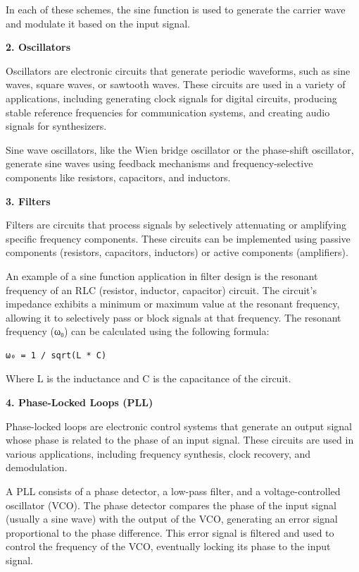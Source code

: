\documentclass[
]{article}
\begin{document}
In each of these schemes, the sine function is used to generate the
carrier wave and modulate it based on the input signal.

\textbf{2. Oscillators}

Oscillators are electronic circuits that generate periodic waveforms,
such as sine waves, square waves, or sawtooth waves. These circuits are
used in a variety of applications, including generating clock signals
for digital circuits, producing stable reference frequencies for
communication systems, and creating audio signals for synthesizers.

Sine wave oscillators, like the Wien bridge oscillator or the
phase-shift oscillator, generate sine waves using feedback mechanisms
and frequency-selective components like resistors, capacitors, and
inductors.

\textbf{3. Filters}

Filters are circuits that process signals by selectively attenuating or
amplifying specific frequency components. These circuits can be
implemented using passive components (resistors, capacitors, inductors)
or active components (amplifiers).

An example of a sine function application in filter design is the
resonant frequency of an RLC (resistor, inductor, capacitor) circuit.
The circuit's impedance exhibits a minimum or maximum value at the
resonant frequency, allowing it to selectively pass or block signals at
that frequency. The resonant frequency (ω₀) can be calculated using the
following formula:

\begin{verbatim}
ω₀ = 1 / sqrt(L * C)
\end{verbatim}

Where L is the inductance and C is the capacitance of the circuit.

\textbf{4. Phase-Locked Loops (PLL)}

Phase-locked loops are electronic control systems that generate an
output signal whose phase is related to the phase of an input signal.
These circuits are used in various applications, including frequency
synthesis, clock recovery, and demodulation.

A PLL consists of a phase detector, a low-pass filter, and a
voltage-controlled oscillator (VCO). The phase detector compares the
phase of the input signal (usually a sine wave) with the output of the
VCO, generating an error signal proportional to the phase difference.
This error signal is filtered and used to control the frequency of the
VCO, eventually locking its phase to the input signal.
\end{document}

